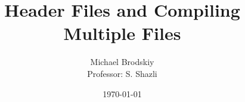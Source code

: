 


\def\code#1{\texttt{#1}}

\pagestyle{fancy}

\title{Header Files and Compiling Multiple Files}
\date{\today}
\author{Michael Brodskiy\\ \small Professor: S. Shazli}



\maketitle

\thispagestyle{fancy}

\newpage

